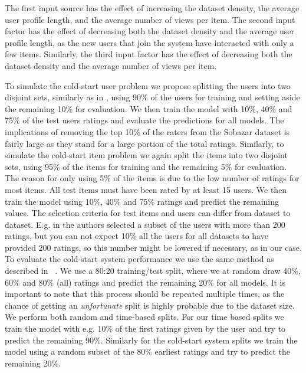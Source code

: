The first input source has the effect of increasing the dataset density, the
average user profile length, and the average number of views per item. The
second input factor has the effect of decreasing both the dataset density and
the average user profile length, as the new users that join the system have
interacted with only a few items. Similarly, the third input factor has the
effect of decreasing both the dataset density and the average number of views
per item.

To simulate the cold-start user problem we propose splitting the users into two
disjoint sets, similarly as in \cite{Stern2009, Lam2008}, using 90\% of the
users for training and setting aside the remaining 10\% for evaluation. We then
train the model with 10\%, 40\% and 75\% of the test users ratings and evaluate
the predictions for all models. The implications of removing the top 10\% of the raters from the
Sobazar dataset is fairly large as they stand for a large portion of the total ratings.
Similarly, to simulate the cold-start item problem we again split the items into two
disjoint sets, using 95\% of the items for training and the remaining 5\% for
evaluation. The reason for only using 5\% of the items is due to the low number of
ratings for most items. All test items must have been rated by at least 15 users.
We then train the model using 10\%, 40\% and 75\% ratings and predict the remaining values. The
selection criteria for test items and users can differ from dataset to dataset.
E.g. in \cite{Rashid2002, Rashid2008} the authors selected a subset of the
users with more than 200 ratings, but you can not expect 10\% all the users for
all datasets to have provided 200 ratings, so this number might be lowered if
necessary, as in our case. To evaluate the cold-start system performance we use the same method as
described in ~\cite{Agarwal2009}. We use a 80:20 training/test split, where
we at random draw 40\%, 60\% and 80\% (all) ratings and predict the 
remaining 20\% for all models. It is important to note that this process should be repeated multiple times, as
the chance of getting an \emph{unfortunate} split is highly probable due to the
dataset size. We perform both random and time-based splits. For our time based
splits we train the model with e.g. 10\% of the first ratings given by the
user and try to predict the remaining 90\%. Similarly for the cold-start
system splits we train the model using a random subset of the 80\%
earliest ratings and try to predict the remaining 20\%.
